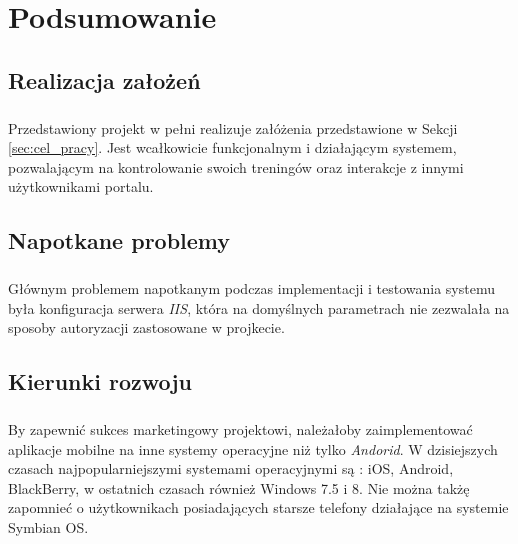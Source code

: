 \chapter{Podsumowanie} %
\label{cha:podsumowanie}

\section{Realizacja założeń} %
\label{sec:realizacja_za_o_e_}
\paragraph{} %
\label{par:}

Przedstawiony projekt w pełni realizuje załóżenia przedstawione w Sekcji \ref{sec:cel_pracy}. Jest wcałkowicie funkcjonalnym i działającym systemem, pozwalającym na kontrolowanie swoich treningów oraz interakcje z innymi użytkownikami portalu.

\section{Napotkane problemy} %
\label{sec:napotkane_problemy}
\paragraph{} %
\label{par:}
Głównym problemem napotkanym podczas implementacji i testowania systemu była konfiguracja serwera \textit{IIS}, która na domyślnych parametrach nie zezwalała na sposoby autoryzacji zastosowane w projkecie.


\section{Kierunki rozwoju} %
\label{sec:kierunki_rozwoju}

\paragraph{} %
\label{par:}
By zapewnić sukces marketingowy projektowi, należałoby zaimplementować aplikacje mobilne na inne systemy operacyjne niż tylko \textit{Andorid}. W dzisiejszych czasach najpopularniejszymi systemami operacyjnymi są : iOS, Android, BlackBerry, w ostatnich czasach również Windows 7.5 i 8. Nie można takżę zapomnieć o użytkownikach posiadających starsze telefony działające na systemie Symbian OS.

